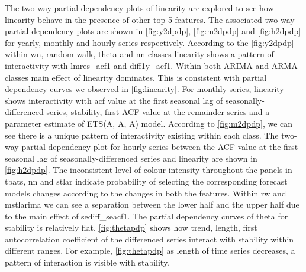 \documentclass[11pt,a4paper,]{article}
\begin{document}
The two-way partial dependency plots of linearity are explored to see how linearity behave in the presence of other top-5 features. The associated two-way partial dependency plots are shown in \autoref{fig:y2dpdp}, \autoref{fig:m2dpdp} and \autoref{fig:h2dpdp} for yearly, monthly and hourly series respectively. According to the \autoref{fig:y2dpdp} within wn, random walk, theta and nn classes linearity shows a pattern of interactivity with lmres\_acf1 and diff1y\_acf1. Within both ARIMA and ARMA classes main effect of linearity dominates. This is consistent with partial dependency curves we observed in \autoref{fig:linearity}. For monthly series, linearity shows interactivity with acf value at the first seasonal lag of seasonally-differenced series, stability, first ACF value at the remainder series and a parameter estimate of ETS(A, A, A) model. According to \autoref{fig:m2dpdp}, we can see there is a unique pattern of interactivity existing within each class. The two-way partial dependency plot for hourly series between the ACF value at the first seasonal lag of seasonally-differenced series and linearity are shown in \autoref{fig:h2dpdp}. The inconsistent level of colour intensity throughout the panels in tbats, nn and stlar indicate probability of selecting the corresponding forecast models changes according to the changes in both the features. Within rw and mstlarima we can see a separation between the lower half and the upper half due to the main effect of sediff\_seacf1. The partial dependency curves of theta for stability is relatively flat. \autoref{fig:thetapdp} shows how trend, length, first autocorrelation coefficient of the differenced series interact with stability within different ranges. For example, \autoref{fig:thetapdp} as length of time series decreases, a pattern of interaction is visible with stability.
\end{document}
